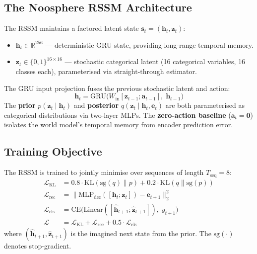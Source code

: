 \documentclass[11pt,a4paper]{article}
\begin{document}
\subsection{The Noosphere RSSM Architecture}
The RSSM maintains a factored latent state $\mathbf{s}_t = (\mathbf{h}_t, \mathbf{z}_t)$:
\begin{itemize}
    \item $\mathbf{h}_t \in \mathbb{R}^{256}$ --- deterministic GRU state, providing long-range temporal memory.
    \item $\mathbf{z}_t \in \{0,1\}^{16 \times 16}$ --- stochastic categorical latent (16 categorical variables, 16 classes each), parameterised via straight-through estimator.
\end{itemize}

The GRU input projection fuses the previous stochastic latent and action:
\begin{equation}
    \mathbf{h}_t = \text{GRU}\bigl(W_{\text{in}}[\mathbf{z}_{t-1}; \mathbf{a}_{t-1}],\; \mathbf{h}_{t-1}\bigr)
\end{equation}
The \textbf{prior} $p(\mathbf{z}_t \mid \mathbf{h}_t)$ and \textbf{posterior} $q(\mathbf{z}_t \mid \mathbf{h}_t, \mathbf{e}_t)$ are both parameterised as categorical distributions via two-layer MLPs. The \textbf{zero-action baseline} ($\mathbf{a}_t = \mathbf{0}$) isolates the world model's temporal memory from encoder prediction error.

\subsection{Training Objective}
The RSSM is trained to jointly minimise over sequences of length $T_{\text{seq}} = 8$:
\begin{align}
    \mathcal{L}_{\text{KL}}  &= 0.8 \cdot \text{KL}(\text{sg}(q) \| p) + 0.2 \cdot \text{KL}(q \| \text{sg}(p)) \\
    \mathcal{L}_{\text{rec}} &= \|\text{MLP}_{\text{dec}}([\mathbf{h}_t; \mathbf{z}_t]) - \mathbf{e}_{t+1}\|_2^2 \\
    \mathcal{L}_{\text{cls}} &= \text{CE}\bigl(\text{Linear}([\hat{\mathbf{h}}_{t+1}; \hat{\mathbf{z}}_{t+1}]),\; y_{t+1}\bigr) \\
    \mathcal{L}              &= \mathcal{L}_{\text{KL}} + \mathcal{L}_{\text{rec}} + 0.5 \cdot \mathcal{L}_{\text{cls}}
\end{align}
where $(\hat{\mathbf{h}}_{t+1}, \hat{\mathbf{z}}_{t+1})$ is the imagined next state from the prior. The $\text{sg}(\cdot)$ denotes stop-gradient.
\end{document}
